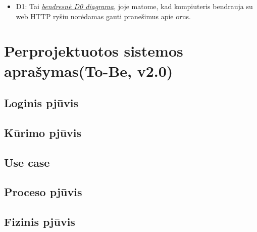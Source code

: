 \documentclass[oneside]{VUMIFPSkursinis}
\begin{document}
	\begin{itemize}
		\item D1: Tai \hyperref[fig:Deployment0]{\textit{bendresnė D0 diagrama}}, joje matome, kad kompiuteris bendrauja su web HTTP ryšiu norėdamas gauti pranešimus apie orus.
	\end{itemize}

\section{Perprojektuotos sistemos aprašymas(To-Be, v2.0)}

\subsection{Loginis pjūvis}
\subsection{Kūrimo pjūvis}
\subsection{Use case}
\subsection{Proceso pjūvis}
\subsection{Fizinis pjūvis}



\end{document}
